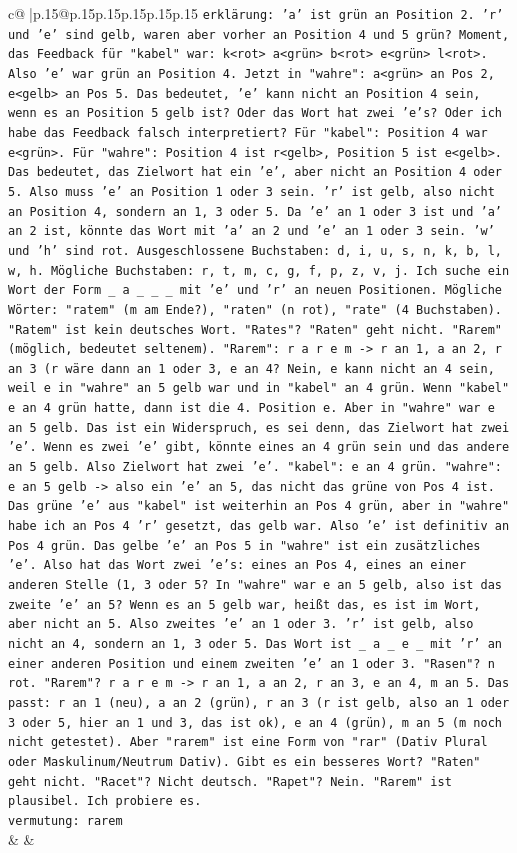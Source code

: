 \documentclass{article}
\begin{document}
{\begin{supertabular}{c@{$\;$}|p{.15\linewidth}@{}p{.15\linewidth}p{.15\linewidth}p{.15\linewidth}p{.15\linewidth}p{.15\linewidth}}
{{{                \texttt{erklärung: 'a' ist grün an Position 2. 'r' und 'e' sind gelb, waren aber vorher an Position 4 und 5 grün? Moment, das Feedback für "kabel" war: k<rot> a<grün> b<rot> e<grün> l<rot>. Also 'e' war grün an Position 4. Jetzt in "wahre": a<grün> an Pos 2, e<gelb> an Pos 5. Das bedeutet, 'e' kann nicht an Position 4 sein, wenn es an Position 5 gelb ist? Oder das Wort hat zwei 'e's? Oder ich habe das Feedback falsch interpretiert? Für "kabel": Position 4 war e<grün>. Für "wahre": Position 4 ist r<gelb>, Position 5 ist e<gelb>. Das bedeutet, das Zielwort hat ein 'e', aber nicht an Position 4 oder 5. Also muss 'e' an Position 1 oder 3 sein. 'r' ist gelb, also nicht an Position 4, sondern an 1, 3 oder 5. Da 'e' an 1 oder 3 ist und 'a' an 2 ist, könnte das Wort mit 'a' an 2 und 'e' an 1 oder 3 sein. 'w' und 'h' sind rot. Ausgeschlossene Buchstaben: d, i, u, s, n, k, b, l, w, h. Mögliche Buchstaben: r, t, m, c, g, f, p, z, v, j. Ich suche ein Wort der Form \_ a \_ \_ \_ mit 'e' und 'r' an neuen Positionen. Mögliche Wörter: "ratem" (m am Ende?), "raten" (n rot), "rate" (4 Buchstaben). "Ratem" ist kein deutsches Wort. "Rates"? "Raten" geht nicht. "Rarem" (möglich, bedeutet seltenem). "Rarem": r a r e m {-}> r an 1, a an 2, r an 3 (r wäre dann an 1 oder 3, e an 4? Nein, e kann nicht an 4 sein, weil e in "wahre" an 5 gelb war und in "kabel" an 4 grün. Wenn "kabel" e an 4 grün hatte, dann ist die 4. Position e. Aber in "wahre" war e an 5 gelb. Das ist ein Widerspruch, es sei denn, das Zielwort hat zwei 'e'. Wenn es zwei 'e' gibt, könnte eines an 4 grün sein und das andere an 5 gelb. Also Zielwort hat zwei 'e'. "kabel": e an 4 grün. "wahre": e an 5 gelb {-}> also ein 'e' an 5, das nicht das grüne von Pos 4 ist. Das grüne 'e' aus "kabel" ist weiterhin an Pos 4 grün, aber in "wahre" habe ich an Pos 4 'r' gesetzt, das gelb war. Also 'e' ist definitiv an Pos 4 grün. Das gelbe 'e' an Pos 5 in "wahre" ist ein zusätzliches 'e'. Also hat das Wort zwei 'e's: eines an Pos 4, eines an einer anderen Stelle (1, 3 oder 5? In "wahre" war e an 5 gelb, also ist das zweite 'e' an 5? Wenn es an 5 gelb war, heißt das, es ist im Wort, aber nicht an 5. Also zweites 'e' an 1 oder 3. 'r' ist gelb, also nicht an 4, sondern an 1, 3 oder 5. Das Wort ist \_ a \_ e \_ mit 'r' an einer anderen Position und einem zweiten 'e' an 1 oder 3. "Rasen"? n rot. "Rarem"? r a r e m {-}> r an 1, a an 2, r an 3, e an 4, m an 5. Das passt: r an 1 (neu), a an 2 (grün), r an 3 (r ist gelb, also an 1 oder 3 oder 5, hier an 1 und 3, das ist ok), e an 4 (grün), m an 5 (m noch nicht getestet). Aber "rarem" ist eine Form von "rar" (Dativ Plural oder Maskulinum/Neutrum Dativ). Gibt es ein besseres Wort? "Raten" geht nicht. "Racet"? Nicht deutsch. "Rapet"? Nein. "Rarem" ist plausibel. Ich probiere es.} \\
\texttt{vermutung: rarem} \\
            }
        }
    }
    & & \\ \\


\end{supertabular}}
\end{document}
